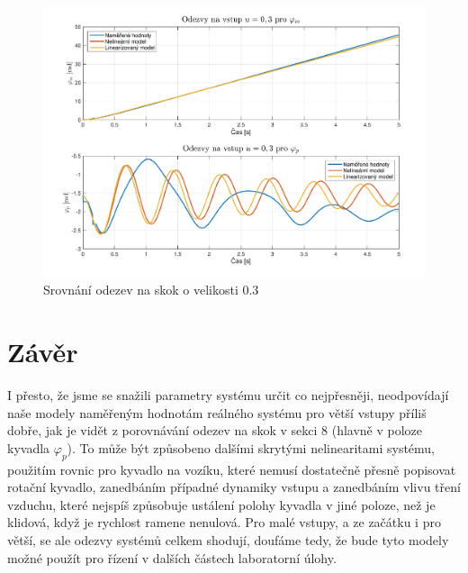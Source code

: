 \documentclass[11pt,a4paper]{article}
\begin{document}
\begin{figure}[H]
\centering
\includegraphics[scale=0.6]{Odezvy03.pdf}
\caption{Srovnání odezev na skok o velikosti 0.3}
\end{figure}


\section{Závěr}
I přesto, že jsme se snažili parametry systému určit co nejpřesněji, neodpovídají naše modely naměřeným hodnotám reálného systému pro větší vstupy příliš dobře, jak je vidět z porovnávání odezev na skok v sekci 8 (hlavně v poloze kyvadla $\varphi_p$). To může být způsobeno dalšími skrytými nelinearitami systému, použitím rovnic pro kyvadlo na vozíku, které nemusí dostatečně přesně popisovat rotační kyvadlo, zanedbáním případné dynamiky vstupu a zanedbáním vlivu tření vzduchu, které nejspíš způsobuje ustálení polohy kyvadla v jiné poloze, než je klidová, když je rychlost ramene nenulová.
\newline
Pro malé vstupy, a ze začátku i pro větší, se ale odezvy systémů celkem shodují, doufáme tedy, že bude tyto modely možné použít pro řízení v dalších částech laboratorní úlohy.
\end{document}
